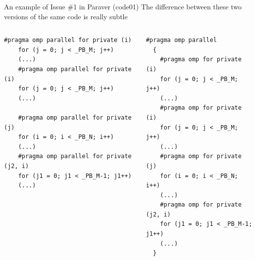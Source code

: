\documentclass[10pt,xcolor=table]{beamer}
\begin{document}
\begin{frame}[fragile]{An example of Issue \#1 in Paraver (code01)}
The difference between these two versions of the same code is really subtle
\begin{columns}
\begin{column}{0.57\textwidth}
\begin{lstlisting}[style=shell,basicstyle=\scriptsize\ttfamily,gobble=3,caption={Several parallel regions}]
     #pragma omp parallel for private (i)
    for (j = 0; j < _PB_M; j++)
    (...)
    #pragma omp parallel for private (i)
    for (j = 0; j < _PB_M; j++)
    (...)
    
    #pragma omp parallel for private (j)
    for (i = 0; i < _PB_N; i++)
    (...)
    #pragma omp parallel for private (j2, i)
    for (j1 = 0; j1 < _PB_M-1; j1++)
    (...)
  \end{lstlisting}
  \end{column}
\begin{column}{0.43\textwidth}
  \begin{lstlisting}[style=shell,gobble=3,basicstyle=\scriptsize\ttfamily,caption={One parallel region}]
   #pragma omp parallel
  {
    #pragma omp for private (i)
    for (j = 0; j < _PB_M; j++)
    (...)
    #pragma omp for private (i)
    for (j = 0; j < _PB_M; j++)
    (...)
    #pragma omp for private (j)
    for (i = 0; i < _PB_N; i++)
    (...)
    #pragma omp for private (j2, i)
    for (j1 = 0; j1 < _PB_M-1; j1++)
    (...)
  }
  \end{lstlisting}
  \end{column}
  \end{columns}
\end{frame}
\end{document}
